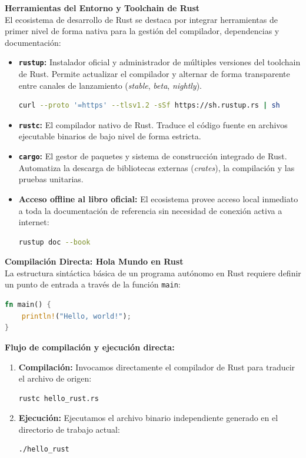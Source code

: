 \documentclass[11pt, a4paper]{article}
\begin{document}
\noindent\textbf{Herramientas del Entorno y Toolchain de Rust}\\[0.5em]
El ecosistema de desarrollo de Rust se destaca por integrar herramientas de primer nivel de forma nativa para la gestión del compilador, dependencias y documentación:
\begin{itemize}
  \item \textbf{\texttt{rustup}:} Instalador oficial y administrador de múltiples versiones del toolchain de Rust. Permite actualizar el compilador y alternar de forma transparente entre canales de lanzamiento (\textit{stable}, \textit{beta}, \textit{nightly}).
    \begin{lstlisting}[language=bash]
curl --proto '=https' --tlsv1.2 -sSf https://sh.rustup.rs | sh
    \end{lstlisting}
  \item \textbf{\texttt{rustc}:} El compilador nativo de Rust. Traduce el código fuente en archivos ejecutable binarios de bajo nivel de forma estricta.
  \item \textbf{\texttt{cargo}:} El gestor de paquetes y sistema de construcción integrado de Rust. Automatiza la descarga de bibliotecas externas (\textit{crates}), la compilación y las pruebas unitarias.
  \item \textbf{Acceso offline al libro oficial:} El ecosistema provee acceso local inmediato a toda la documentación de referencia sin necesidad de conexión activa a internet:
    \begin{lstlisting}[language=bash]
rustup doc --book
    \end{lstlisting}
\end{itemize}

\noindent\textbf{Compilación Directa: Hola Mundo en Rust}\\[0.5em]
La estructura sintáctica básica de un programa autónomo en Rust requiere definir un punto de entrada a través de la función \texttt{main}:

\begin{lstlisting}[language=Rust, caption={Hola Mundo básico en Rust}, path={/Ejercicios/hello_rust/hello_rust.rs}]
fn main() {
    println!("Hello, world!");
}
\end{lstlisting}

\noindent\textbf{Flujo de compilación y ejecución directa:}
\begin{enumerate}
  \item \textbf{Compilación:} Invocamos directamente el compilador de Rust para traducir el archivo de origen:
    \begin{lstlisting}[language=bash]
rustc hello_rust.rs
    \end{lstlisting}
  \item \textbf{Ejecución:} Ejecutamos el archivo binario independiente generado en el directorio de trabajo actual:
    \begin{lstlisting}[language=bash]
./hello_rust
    \end{lstlisting}
\end{enumerate}
\end{document}
